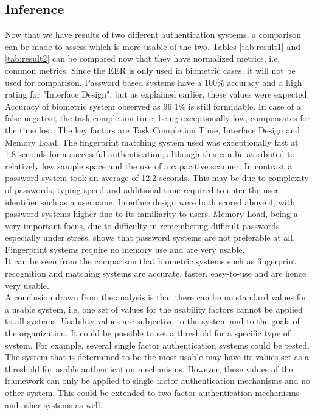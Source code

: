 \subsection{Inference}
Now that we have results of two different authentication systems, a comparison can be made to assess which is more usable of the two. Tables \ref{tab:result1} and \ref{tab:result2} can be compared now that they have normalized metrics, i.e, common metrics. Since the EER is only used in biometric cases, it will not be used for comparison. Password based systems have a 100\% accuracy and a high rating for "Interface Design", but as explained earlier, these values were expected. Accuracy of biometric system observed as 96.1\% is still formidable. In case of a false negative, the task completion time, being exceptionally low, compensates for the time lost. The key factors are Task Completion Time, Interface Design and Memory Load. The fingerprint matching system used was exceptionally fast at 1.8 seconds for a successful authentication, although this can be attributed to relatively low sample space and the use of a capacitive scanner. In contrast a password system took an average of 12.2 seconds. This may be due to complexity of passwords, typing speed and additional time required to enter the user identifier such as a username. Interface design were both scored above 4, with password systems higher due to its familiarity to users. Memory Load, being a very important focus, due to difficulty in remembering difficult passwords especially under stress, shows that password systems are not preferable at all. Fingerprint systems require no memory use and are very usable.\\
It can be seen from the comparison that biometric systems such as fingerprint recognition and matching systems are accurate, faster, easy-to-use and are hence very usable.\\
A conclusion drawn from the analysis is that there can be no standard values for a usable system, i.e, one set of values for the usability factors cannot be applied to all systems. Usability values are subjective to the system and to the goals of the organization. It could be possible to set a threshold for a specific type of system. For example, several single factor authentication systems could be tested. The system that is determined to be the most usable may have its values set as a threshold for usable authentication mechanisms. However, these values of the framework can only be applied to single factor authentication mechanisms and no other system. This could be extended to two factor authentication mechanisms and other systems as well.

